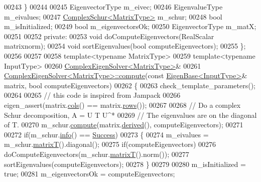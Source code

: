 \begin{DoxyCode}
00243     \}
00244     
00245     EigenvectorType m\_eivec;
00246     EigenvalueType m\_eivalues;
00247     \hyperlink{group___eigenvalues___module}{ComplexSchur<MatrixType>} m\_schur;
00248     \textcolor{keywordtype}{bool} m\_isInitialized;
00249     \textcolor{keywordtype}{bool} m\_eigenvectorsOk;
00250     EigenvectorType m\_matX;
00251 
00252   \textcolor{keyword}{private}:
00253     \textcolor{keywordtype}{void} doComputeEigenvectors(RealScalar matrixnorm);
00254     \textcolor{keywordtype}{void} sortEigenvalues(\textcolor{keywordtype}{bool} computeEigenvectors);
00255 \};
00256 
00257 
00258 \textcolor{keyword}{template}<\textcolor{keyword}{typename} MatrixType>
00259 \textcolor{keyword}{template}<\textcolor{keyword}{typename} InputType>
00260 \hyperlink{group___eigenvalues___module_class_eigen_1_1_complex_eigen_solver}{ComplexEigenSolver<MatrixType>}& 
00261 \hyperlink{group___eigenvalues___module_aeb7e38c6db5369f5c974f3786e94c1f0}{ComplexEigenSolver<MatrixType>::compute}(\textcolor{keyword}{const} 
      \hyperlink{group___core___module_struct_eigen_1_1_eigen_base}{EigenBase<InputType>}& matrix, \textcolor{keywordtype}{bool} computeEigenvectors)
00262 \{
00263   check\_template\_parameters();
00264   
00265   \textcolor{comment}{// this code is inspired from Jampack}
00266   eigen\_assert(matrix.\hyperlink{group___core___module_a7b0b45c7351847696c911ce8aa2abbdb}{cols}() == matrix.\hyperlink{group___core___module_a8141320ba8df384426c298b32b000d8e}{rows}());
00267 
00268   \textcolor{comment}{// Do a complex Schur decomposition, A = U T U^*}
00269   \textcolor{comment}{// The eigenvalues are on the diagonal of T.}
00270   m\_schur.\hyperlink{group___eigenvalues___module_a3543d2c286563108cd9ace672bbb1c09}{compute}(matrix.\hyperlink{group___core___module_a324b16961a11d2ecfd2d1b7dd7946545}{derived}(), computeEigenvectors);
00271 
00272   \textcolor{keywordflow}{if}(m\_schur.\hyperlink{group___eigenvalues___module_a8c5ee15fecfd126fc362c3f2fd28f51e}{info}() == \hyperlink{group__enums_gga85fad7b87587764e5cf6b513a9e0ee5ea52581b035f4b59c203b8ff999ef5fcea}{Success})
00273   \{
00274     m\_eivalues = m\_schur.\hyperlink{group___eigenvalues___module_add3ab5ed83f7f2f06b79fa910a2d5684}{matrixT}().diagonal();
00275     \textcolor{keywordflow}{if}(computeEigenvectors)
00276       doComputeEigenvectors(m\_schur.\hyperlink{group___eigenvalues___module_add3ab5ed83f7f2f06b79fa910a2d5684}{matrixT}().norm());
00277     sortEigenvalues(computeEigenvectors);
00278   \}
00279 
00280   m\_isInitialized = \textcolor{keyword}{true};
00281   m\_eigenvectorsOk = computeEigenvectors;

\end{DoxyCode}
